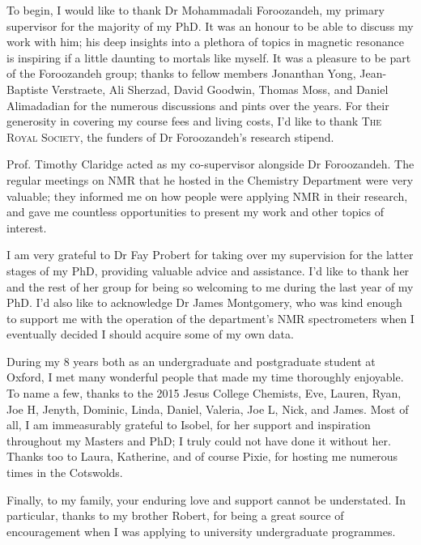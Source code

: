 \begin{acknowledgements}
    To begin, I would like to thank Dr Mohammadali Foroozandeh, my primary
    supervisor for the majority of my PhD. It was an honour to be able to
    discuss my work with him; his deep insights into a plethora of
    topics in magnetic resonance is inspiring if a little daunting to
    mortals like myself.
    It was a pleasure to be part of the Foroozandeh group; thanks to fellow
    members Jonanthan Yong, Jean-Baptiste Verstraete, Ali Sherzad, David
    Goodwin, Thomas Moss, and Daniel Alimadadian for the numerous discussions
    and pints over the years.
    For their generosity in covering my course fees and living costs, I'd like
    to thank \textsc{The Royal Society}, the funders of Dr Foroozandeh's research
    stipend.

    Prof. Timothy Claridge acted as my co-supervisor alongside Dr Foroozandeh.
    The regular meetings on NMR that he hosted in the Chemistry Department were
    very valuable; they informed me on how people were applying NMR in their
    research, and gave me countless opportunities to present my work and other
    topics of interest.

    I am very grateful to Dr Fay Probert for taking over my supervision for the
    latter stages of my PhD, providing valuable advice and assistance.
    I'd like to thank her and the rest of her group for being so welcoming to
    me during the last year of my PhD. I'd also like to acknowledge Dr James
    Montgomery, who was kind enough to support me with the
    operation of the department's NMR spectrometers when I eventually decided
    I should acquire some of my own data.

    During my 8 years both as an undergraduate and postgraduate student at
    Oxford, I met many wonderful people that made my time thoroughly enjoyable.
    To name a few, thanks to the 2015 Jesus College Chemists, Eve, Lauren,
    Ryan, Joe H, Jenyth, Dominic, Linda, Daniel, Valeria, Joe L, Nick,
    and James. Most of all, I am immeasurably grateful to Isobel, for her
    support and inspiration throughout my Masters and PhD; I truly could not
    have done it without her. Thanks too to Laura, Katherine, and of course
    Pixie, for hosting me numerous times in the Cotswolds.

    Finally, to my family, your enduring love and support cannot be
    understated. In particular, thanks to my brother Robert, for being a great
    source of encouragement when I was applying to university undergraduate
    programmes.
\end{acknowledgements}
